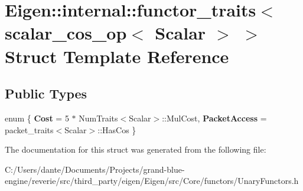 \hypertarget{struct_eigen_1_1internal_1_1functor__traits_3_01scalar__cos__op_3_01_scalar_01_4_01_4}{}\section{Eigen\+::internal\+::functor\+\_\+traits$<$ scalar\+\_\+cos\+\_\+op$<$ Scalar $>$ $>$ Struct Template Reference}
\label{struct_eigen_1_1internal_1_1functor__traits_3_01scalar__cos__op_3_01_scalar_01_4_01_4}
\subsection*{Public Types}
\begin{DoxyCompactItemize}
\item 
\mbox{\label{struct_eigen_1_1internal_1_1functor__traits_3_01scalar__cos__op_3_01_scalar_01_4_01_4_a5eb17b4b97cb4d83247c14bbc3484cdf}} 
enum \{ {\bfseries Cost} = 5 $\ast$ Num\+Traits$<$Scalar$>$\+::Mul\+Cost, 
{\bfseries Packet\+Access} = packet\+\_\+traits$<$Scalar$>$\+::Has\+Cos
 \}
\end{DoxyCompactItemize}


The documentation for this struct was generated from the following file\+:\begin{DoxyCompactItemize}
\item 
C\+:/\+Users/dante/\+Documents/\+Projects/grand-\/blue-\/engine/reverie/src/third\+\_\+party/eigen/\+Eigen/src/\+Core/functors/Unary\+Functors.\+h\end{DoxyCompactItemize}
